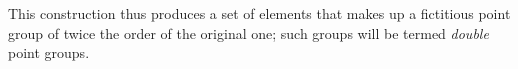 This construction thus produces a set of elements that makes up a fictitious point group of twice the order of the original one; such groups will be termed \emph{double} point groups.

